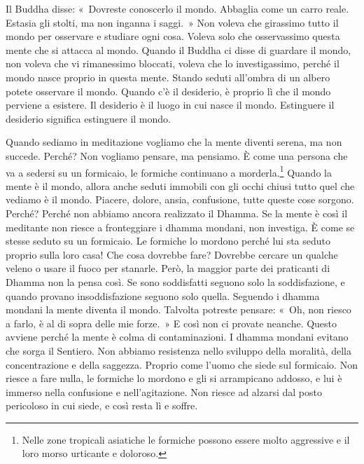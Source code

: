 Il Buddha disse: «~Dovreste conoscerlo il mondo. Abbaglia come un carro
reale. Estasia gli stolti, ma non inganna i saggi.~» Non voleva che
girassimo tutto il mondo per osservare e studiare ogni cosa. Voleva solo
che osservassimo questa mente che si attacca al mondo. Quando il Buddha
ci disse di guardare il mondo, non voleva che vi rimanessimo bloccati,
voleva che lo investigassimo, perché il mondo nasce proprio in questa
mente. Stando seduti all'ombra di un albero potete osservare il mondo.
Quando c'è il desiderio, è proprio lì che il mondo perviene a esistere.
Il desiderio è il luogo in cui nasce il mondo. Estinguere il desiderio
significa estinguere il mondo.

Quando sediamo in meditazione vogliamo che la mente diventi serena, ma
non succede. Perché? Non vogliamo pensare, ma pensiamo. È come una
persona che va a sedersi su un formicaio, le formiche continuano a
morderla.\footnote{Nelle zone tropicali asiatiche le formiche possono
  essere molto aggressive e il loro morso urticante e doloroso.} Quando
la mente è il mondo, allora anche seduti immobili con gli occhi chiusi
tutto quel che vediamo è il mondo. Piacere, dolore, ansia, confusione,
tutte queste cose sorgono. Perché? Perché non abbiamo ancora realizzato
il Dhamma. Se la mente è così il meditante non riesce a fronteggiare i
dhamma mondani, non investiga. È come se stesse seduto su un
formicaio. Le formiche lo mordono perché lui sta seduto proprio sulla
loro casa! Che cosa dovrebbe fare? Dovrebbe cercare un qualche veleno o
usare il fuoco per stanarle. Però, la maggior parte dei praticanti di
Dhamma non la pensa così. Se sono soddisfatti seguono solo la
soddisfazione, e quando provano insoddisfazione seguono solo quella.
Seguendo i dhamma mondani la mente diventa il mondo. Talvolta
potreste pensare: «~Oh, non riesco a farlo, è al di sopra delle mie
forze.~» E così non ci provate neanche. Questo avviene perché la mente è
colma di contaminazioni. I dhamma mondani evitano che sorga il
Sentiero. Non abbiamo resistenza nello sviluppo della moralità, della
concentrazione e della saggezza. Proprio come l'uomo che siede sul
formicaio. Non riesce a fare nulla, le formiche lo mordono e gli si
arrampicano addosso, e lui è immerso nella confusione e nell'agitazione.
Non riesce ad alzarsi dal posto pericoloso in cui siede, e così resta lì
e soffre.

